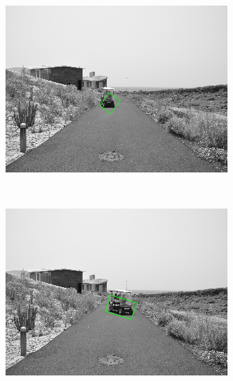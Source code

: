\begin{figure}[h!]
\begin{subfigure}[b]{0.24\columnwidth}
	    \includegraphics[width=\textwidth]{sequence/seq5}\label{fig:seq5}
        \end{subfigure}%
        ~
        \begin{subfigure}[b]{0.24\columnwidth}
	    \includegraphics[width=\textwidth]{sequence/seq6}\label{fig:seq6}
        \end{subfigure}%
        ~
        \begin{subfigure}[b]{0.24\columnwidth}

\end{subfigure}
\end{figure}
